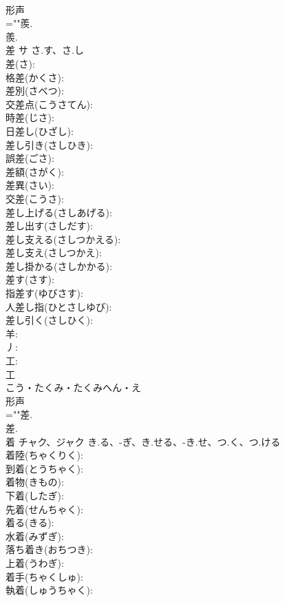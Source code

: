 \documentclass[8pt]{extreport}
\begin{document}
\begin{CJK}{UTF8}{min}
\\	形声 
\\	=""羨.
\\	羨.
\\	差	サ	さ.す、さ.し		
\\	差(さ): 
\\	格差(かくさ): 
\\	差別(さべつ): 
\\	交差点(こうさてん): 
\\	時差(じさ): 
\\	日差し(ひざし): 
\\	差し引き(さしひき): 
\\	誤差(ごさ): 
\\	差額(さがく): 
\\	差異(さい): 
\\	交差(こうさ): 
\\	差し上げる(さしあげる): 
\\	差し出す(さしだす): 
\\	差し支える(さしつかえる): 
\\	差し支え(さしつかえ): 
\\	差し掛かる(さしかかる): 
\\	差す(さす): 
\\	指差す(ゆびさす): 
\\	人差し指(ひとさしゆび): 
\\	差し引く(さしひく): 
\\	羊: 
\\	丿: 
\\	工: 
\\	工	
\\	こう・たくみ・たくみへん・え	
\\	形声 
\\	=""差.
\\	差.
\\	着	チャク、ジャク	き.る、-ぎ、き.せる、-き.せ、つ.く、つ.ける		
\\	着陸(ちゃくりく): 
\\	到着(とうちゃく): 
\\	着物(きもの): 
\\	下着(したぎ): 
\\	先着(せんちゃく): 
\\	着る(きる): 
\\	水着(みずぎ): 
\\	落ち着き(おちつき): 
\\	上着(うわぎ): 
\\	着手(ちゃくしゅ): 
\\	執着(しゅうちゃく): 

\end{CJK}
\end{document}

